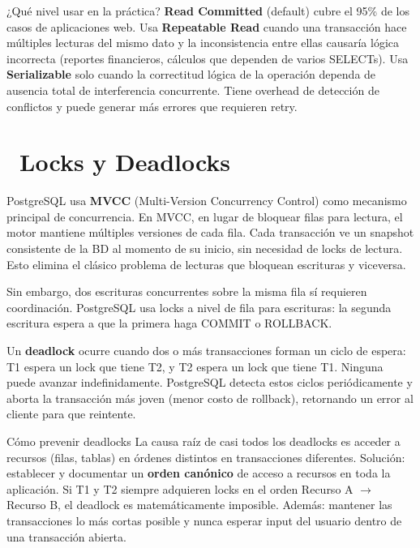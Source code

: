 \begin{tipbox}{¿Qué nivel usar en la práctica?}
\textbf{Read Committed} (default) cubre el 95\% de los casos de aplicaciones web.
Usa \textbf{Repeatable Read} cuando una transacción hace múltiples lecturas del mismo dato y la inconsistencia entre ellas causaría lógica incorrecta (reportes financieros, cálculos que dependen de varios SELECTs).
Usa \textbf{Serializable} solo cuando la correctitud lógica de la operación dependa de ausencia total de interferencia concurrente. Tiene overhead de detección de conflictos y puede generar más errores que requieren retry.
\end{tipbox}

\section[Locks y Deadlocks]{~Locks y Deadlocks}

PostgreSQL usa \textbf{MVCC} (Multi-Version Concurrency Control) como mecanismo principal de concurrencia.
En MVCC, en lugar de bloquear filas para lectura, el motor mantiene múltiples versiones de cada fila.
Cada transacción ve un snapshot consistente de la BD al momento de su inicio, sin necesidad de locks de lectura.
Esto elimina el clásico problema de lecturas que bloquean escrituras y viceversa.

Sin embargo, dos escrituras concurrentes sobre la misma fila sí requieren coordinación.
PostgreSQL usa locks a nivel de fila para escrituras: la segunda escritura espera a que la primera haga COMMIT o ROLLBACK.

Un \textbf{deadlock} ocurre cuando dos o más transacciones forman un ciclo de espera: T1 espera un lock que tiene T2, y T2 espera un lock que tiene T1.
Ninguna puede avanzar indefinidamente.
PostgreSQL detecta estos ciclos periódicamente y aborta la transacción más joven (menor costo de rollback), retornando un error al cliente para que reintente.

\begin{warningbox}{Cómo prevenir deadlocks}
La causa raíz de casi todos los deadlocks es acceder a recursos (filas, tablas) en órdenes distintos en transacciones diferentes.
Solución: establecer y documentar un \textbf{orden canónico} de acceso a recursos en toda la aplicación.
Si T1 y T2 siempre adquieren locks en el orden Recurso A $\to$ Recurso B, el deadlock es matemáticamente imposible.
Además: mantener las transacciones lo más cortas posible y nunca esperar input del usuario dentro de una transacción abierta.
\end{warningbox}

